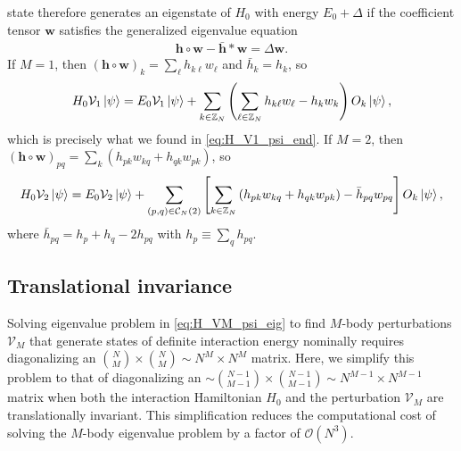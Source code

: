 \documentclass[nofootinbib,notitlepage,11pt]{revtex4-2}
\newcommand{\p}[1]{\left(#1\right)} %
\renewcommand{\sp}[1]{\left[#1\right]} %
\newcommand{\m}{\bm} %
\newcommand{\1}{\mathds{1}}
\newcommand{\C}{\mathcal{C}}
\renewcommand{\O}{\mathcal{O}}
\newcommand{\V}{\mathcal{V}}
\newcommand{\ZZ}{\mathbb{Z}}
\begin{document}
state therefore generates an eigenstate of $H_0$ with energy
$E_0+\Delta$ if the coefficient tensor $\m w$ satisfies the
generalized eigenvalue equation
\begin{align}
  \m h\circ\m w - \bar{\m h} * \m w = \Delta \m w.
  \label{eq:H_VM_psi_eig}
\end{align}
If $M=1$, then $\p{\m h\circ\m w}_k=\sum_\ell h_{k\ell}w_\ell$ and
$\bar h_k=h_k$, so
\begin{align}
  H_0 \V_1 \ket\psi
  = E_0 \V_1 \ket\psi + \sum_{k\in\ZZ_N}
  \p{\sum_{\ell\in\ZZ_N} h_{k\ell} w_\ell - h_k w_k} O_k \ket\psi,
\end{align}
which is precisely what we found in \eqref{eq:H_V1_psi_end}.  If
$M=2$, then
$\p{\m h\circ\m w}_{pq}=\sum_k\p{h_{pk}w_{kq}+h_{qk}w_{pk}}$, so
\begin{align}
  H_0 \V_2 \ket\psi
  = E_0 \V_2 \ket\psi + \sum_{\p{p,q}\in\C_N\p{2}}
  \sp{\sum_{k\in\ZZ_N}\p{h_{pk} w_{kq} + h_{qk} w_{pk}}
    - \bar h_{pq} w_{pq}}
  O_k \ket\psi,
\end{align}
where $\bar h_{pq}=h_p+h_q-2h_{pq}$ with $h_p\equiv\sum_qh_{pq}$.

\subsection{Translational invariance}
\label{sec:H_VM_psi_TI}

Solving eigenvalue problem in \eqref{eq:H_VM_psi_eig} to find $M$-body
perturbations $\V_M$ that generate states of definite interaction
energy nominally requires diagonalizing an
${N\choose M}\times{N\choose M}\sim N^M\times N^M$ matrix.  Here, we
simplify this problem to that of diagonalizing an
$\sim{N-1\choose M-1}\times{N-1\choose M-1}\sim N^{M-1}\times N^{M-1}$
matrix when both the interaction Hamiltonian $H_0$ and the
perturbation $\V_M$ are translationally invariant.  This
simplification reduces the computational cost of solving the $M$-body
eigenvalue problem by a factor of $\O\p{N^3}$.
\end{document}
